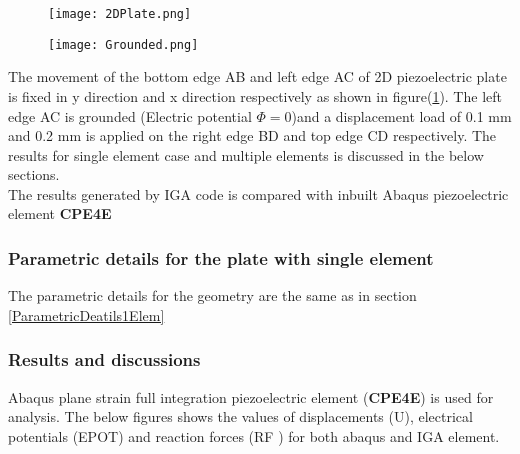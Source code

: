 \documentclass[11pt]{article}
\begin{document}
\begin{figure}[H]
	\centering
	\begin{minipage}{.5\textwidth}
		\centering
		\texttt{[image: 2DPlate.png]}
		\label{2Dplate}
	\end{minipage}%
	\begin{minipage}{.5\textwidth}
		\centering
		\texttt{[image: Grounded.png]}
		\label{EMLoading}
	\end{minipage}
\end{figure}
The movement of the bottom edge AB and left edge AC of 2D piezoelectric plate is fixed
in y direction and x direction respectively as shown in figure(\ref{EMLoading}).
The left edge AC is grounded (Electric potential $\Phi = 0$)and a displacement load
of 0.1 mm and 0.2 mm is applied on the right edge BD and top edge CD respectively. The
results for single element case and multiple elements is discussed in the below
sections. \\
The results generated by IGA code is compared with inbuilt Abaqus piezoelectric
element \textbf{CPE4E}

\subsubsection{Parametric details for the plate with single element}


The parametric details for the geometry are the same as in section \hyperref[ParametricDeatils1Elem]{\ref{ParametricDeatils1Elem}}

\subsubsection{Results and discussions}
Abaqus plane strain full integration piezoelectric element (\textbf{CPE4E}) is used for analysis. The below figures shows the values of displacements (U), electrical potentials (EPOT) and reaction forces (RF ) for both abaqus and IGA element.
\end{document}
